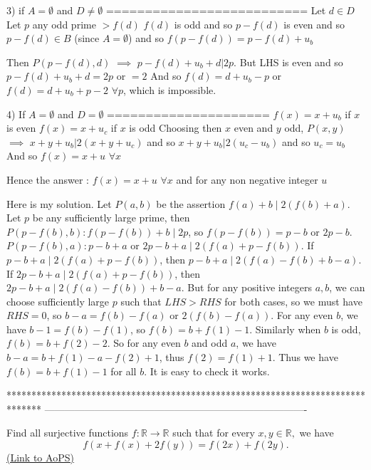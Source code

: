 \begin{solution}
3) if $A=\emptyset$ and $D\ne \emptyset$
==========================
Let $d\in D$
Let $p$ any odd prime $>f(d)$
$f(d)$ is odd and so $p-f(d)$ is even and so $p-f(d)\in B$ (since $A=\emptyset$) and so $f(p-f(d))=p-f(d)+u_b$

Then $P(p-f(d),d)$ $\implies$ $p-f(d)+u_b+d|2p$. But LHS is even and so $p-f(d)+u_b+d=2p$ or $=2$
And so $f(d)=d+u_b-p$ or $f(d)=d+u_b+p-2$ $\forall p$, which is impossible.

4) If $A=\emptyset$ and $D=\emptyset$
=====================
$f(x)=x+u_b$ if $x$ is even
$f(x)=x+u_c$ if $x$ is odd
Choosing then $x$ even and $y$ odd, $P(x,y)$ $\implies$ $x+y+u_b|2(x+y+u_c)$ and so $x+y+u_b|2(u_c-u_b)$ and so $u_c=u_b$
And so $f(x)=x+u$ $\forall x$


Hence the answer : $\boxed{f(x)=x+u}$ $\forall x$ and for any non negative integer $u$
\end{solution}



\begin{solution}
	Here is my solution.
Let $P(a,b)$ be the assertion $f(a)+b\mid 2(f(b)+a)$.
Let $p$ be any sufficiently large prime, then
$P(p-f(b),b):f(p-f(b))+b\mid 2p$, so $f(p-f(b))=p-b$ or $2p-b$. 
$P(p-f(b),a):p-b+a$ or $2p-b+a\mid 2(f(a)+p-f(b))$.
If $p-b+a\mid 2(f(a)+p-f(b))$, then $p-b+a\mid 2(f(a)-f(b)+b-a)$.
If $2p-b+a\mid 2(f(a)+p-f(b))$, then $2p-b+a\mid 2(f(a)-f(b))+b-a$.
But for any positive integers $a,b$, we can choose sufficiently large $p$ such that $LHS>RHS$ for both cases, so we must have $RHS=0$, so $b-a=f(b)-f(a)$ or $2(f(b)-f(a))$. For any even $b$, we have $b-1=f(b)-f(1)$, so $f(b)=b+f(1)-1$. Similarly when $b$ is odd, $f(b)=b+f(2)-2$. So for any even $b$ and odd $a$, we have $b-a=b+f(1)-a-f(2)+1$, thus $f(2)=f(1)+1$. Thus we have $f(b)=b+f(1)-1$ for all $b$. It is easy to check it works.
\end{solution}
*******************************************************************************
-------------------------------------------------------------------------------

\begin{problem}
	Find all surjective functions $f: \mathbb R \to \mathbb R$ such that for every $x,y\in \mathbb R,$ we have
\[f(x+f(x)+2f(y))=f(2x)+f(2y).\]
	\flushright \href{https://artofproblemsolving.com/community/c6h405971}{(Link to AoPS)}
\end{problem}



